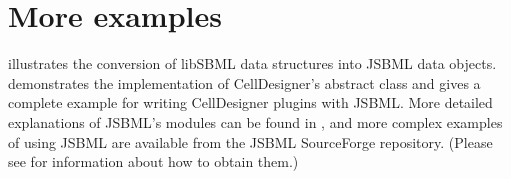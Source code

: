 
\section{More examples}

 illustrates the conversion of libSBML data structures
into JSBML data objects.  demonstrates the
implementation of CellDesigner's abstract class  and
 gives a complete example for writing CellDesigner plugins
with JSBML.   More detailed explanations of JSBML's
modules can be found in , and more complex
examples of using JSBML are available from the JSBML SourceForge repository.
(Please see  for information about how to obtain
them.)
